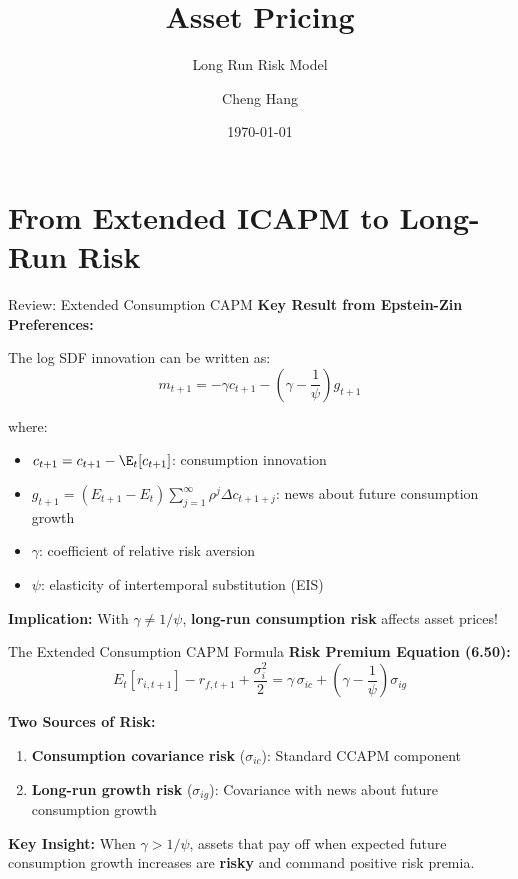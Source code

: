 \documentclass{beamer}
\title[Asset Pricing]{\textbf{Asset Pricing}} %
\subtitle{Long Run Risk Model}
\author[Cheng Hang]{Cheng Hang} %
\institute[DUFE] 
{School of Fintech \\
Dongbei University of Finance \& Economics \\ 
\medskip
\textbf{chenghangch@qq.com}
}
\date{\today}
\begin{document}
\begin{frame}
\titlepage %
\end{frame}


\section{From Extended ICAPM to Long-Run Risk}

\begin{frame}{Review: Extended Consumption CAPM}
    \textbf{Key Result from Epstein-Zin Preferences:}
    
    The log SDF innovation can be written as:
    \begin{equation}
        m_{t+1} = -\gamma c_{t+1} - \left(\gamma - \frac{1}{\psi}\right) g_{t+1}
    \end{equation}
    
    where:
    \begin{itemize}
        \item $c_{t+1} = c_{t+1} - \E_t[c_{t+1}]$: consumption innovation
        \item $g_{t+1} = (E_{t+1} - E_t) \sum_{j=1}^{\infty} \rho^j \Delta c_{t+1+j}$: news about future consumption growth
        \item $\gamma$: coefficient of relative risk aversion
        \item $\psi$: elasticity of intertemporal substitution (EIS)
    \end{itemize}

    \textbf{Implication:} With $\gamma \neq 1/\psi$, \textbf{long-run consumption risk} affects asset prices!
\end{frame}

\begin{frame}{The Extended Consumption CAPM Formula}
    \textbf{Risk Premium Equation (6.50):}
    \begin{equation}
        E_t[r_{i,t+1}] - r_{f,t+1} + \frac{\sigma_i^2}{2} = \gamma \, \sigma_{ic} + \left(\gamma - \frac{1}{\psi}\right) \sigma_{ig}
    \end{equation}
    
    \vspace{0.3cm}
    \textbf{Two Sources of Risk:}
    \begin{enumerate}
        \item \textbf{Consumption covariance risk} ($\sigma_{ic}$): Standard CCAPM component
        \item \textbf{Long-run growth risk} ($\sigma_{ig}$): Covariance with news about future consumption growth
    \end{enumerate}
    
    \vspace{0.3cm}
    \textbf{Key Insight:} When $\gamma > 1/\psi$, assets that pay off when expected future consumption growth increases are \textbf{risky} and command positive risk premia.
\end{frame}
\end{document}

